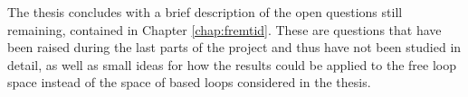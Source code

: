 The thesis concludes with a brief description of the open questions
still remaining, contained in Chapter \ref{chap:fremtid}. These are
questions that have been raised during the last parts of the project
and thus have not been studied in detail, as well as small ideas for
how the results could be applied to the free loop space instead of
the space of based loops considered in the thesis.








